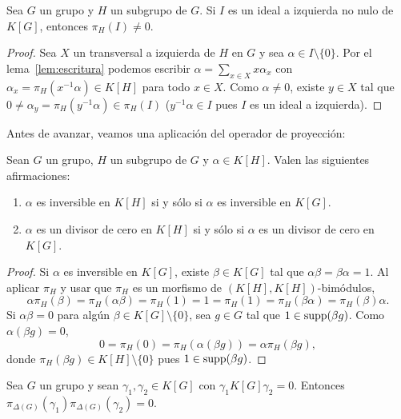 
\begin{lemma}
	\label{lem:ideal_pi}
	Sea $G$ un grupo y $H$ un subgrupo de $G$.  Si $I$ es un ideal a izquierda
	no nulo de $K[G]$, entonces $\pi_H(I)\ne 0$.
\end{lemma}

\begin{proof}
	Sea $X$ un transversal a izquierda de $H$ en $G$ y sea $\alpha\in I\setminus\{0\}$. Por
	el lema~\ref{lem:escritura} podemos escribir $\alpha=\sum_{x\in
	X}x\alpha_x$ con $\alpha_x=\pi_H(x^{-1}\alpha)\in K[H]$ para todo $x\in X$.
	Como $\alpha\ne0$, existe $y\in X$ tal que $0\ne
	\alpha_y=\pi_H(y^{-1}\alpha)\in\pi_H(I)$ ($y^{-1}\alpha\in I$ pues $I$ es
	un ideal a izquierda).
\end{proof}

Antes de avanzar, veamos una aplicación del operador de proyección:

\begin{proposition}
	Sean $G$ un grupo, $H$ un subgrupo de $G$ y $\alpha\in K[H]$. Valen las siguientes afirmaciones:
	\begin{enumerate}
		\item $\alpha$ es inversible en $K[H]$ si y sólo si $\alpha$ es
			inversible en $K[G]$.
		\item $\alpha$ es un divisor de cero en $K[H]$ si y sólo si $\alpha$ es
			un divisor de cero en $K[G]$.
	\end{enumerate}
\end{proposition}

\begin{proof}
	Si $\alpha$ es inversible en $K[G]$, existe $\beta\in K[G]$ tal que
	$\alpha\beta=\beta\alpha=1$. Al aplicar $\pi_H$ y usar que $\pi_H$ es un
	morfismo de $(K[H],K[H])$-bimódulos, 
	\[
		\alpha\pi_H(\beta)=\pi_H(\alpha\beta)=\pi_H(1)=1=\pi_H(1)=\pi_H(\beta\alpha)=\pi_H(\beta)\alpha.
	\]
	Si $\alpha\beta=0$ para algún $\beta\in K[G]\setminus\{0\}$, sea $g\in G$
	tal que $1\in\operatorname{supp}(\beta g)$. Como $\alpha(\beta g)=0$, 
	\[
		0=\pi_H(0)=\pi_H(\alpha(\beta g))=\alpha\pi_H(\beta g),
	\]
	donde $\pi_H(\beta g)\in K[H]\setminus\{0\}$ pues $1\in\operatorname{supp}(\beta g)$. 
\end{proof}

\begin{lemma}[Passman]
	\label{lem:Passman}
	Sea $G$ un grupo y sean  
	$\gamma_1,\gamma_2\in K[G]$ con $\gamma_1K[G]\gamma_2=0$.
	Entonces $\pi_{\Delta(G)}(\gamma_1)\pi_{\Delta(G)}(\gamma_2)=0$.
\end{lemma}

